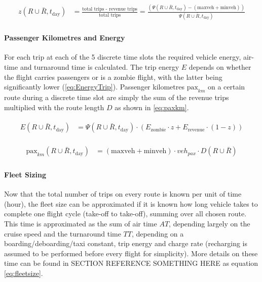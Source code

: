 \begin{align} \label{eq:zombierat}
\begin{split}
    z(R\cup\bar{R}, t_{\text{day}}) &= \frac{\text{total trips - revenue trips}}{\text{total trips}} = \frac{(\Psi(R\cup\bar{R}, t_{\text{day}}) - (\text{maxveh} + \text{minveh}))}{\Psi(R\cup\bar{R}, t_{\text{day}})}
\end{split}
\end{align}


\paragraph{Passenger Kilometres and Energy}

For each trip at each of the 5 discrete time slots the required vehicle energy, air-time and turnaround time is calculated. The trip energy $E$ depends on whether the flight carries passengers or is a zombie flight, with the latter being significantly lower (\autoref{eq:EnergyTrip}). Passenger kilometres $\text{pax}_{km}$ on a certain route during a discrete time slot are simply the sum of the revenue trips multiplied with the route length $D$ as shown in \autoref{eq:paxkm}.

\begin{align} \label{eq:EnergyTrip}
\begin{split}
    E(R\cup\bar{R}, t_{\text{day}}) &= \Psi(R\cup\bar{R}, t_{\text{day}}) \cdot \left(E_{\text{zombie}} \cdot z + E_{\text{revenue}} \cdot (1-z) \right)
\end{split}
\end{align}

\begin{align} \label{eq:paxkm}
\begin{split}
    \text{pax}_{km}(R\cup\bar{R}, t_{\text{day}}) &= \left( \text{maxveh} + \text{minveh} \right) \cdot veh_{pax} \cdot D(R\cup\bar{R})
\end{split}
\end{align}


\paragraph{Fleet Sizing}

Now that the total number of trips on every route is known per unit of time (hour), the fleet size can be approximated if it is known how long vehicle takes to complete one flight cycle (take-off to take-off), summing over all chosen route. This time is approximated as the sum of air time $AT$, depending largely on the cruise speed and the turnaround time $TT$, depending on a boarding/deboarding/taxi constant, trip energy and charge rate (recharging is assumed to be performed before every flight for simplicity). More details on these time can be found in SECTION REFERENCE SOMETHING HERE as equation \autoref{eq:fleetsize}.

